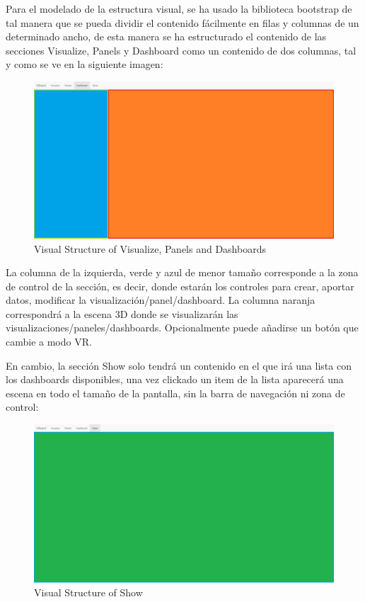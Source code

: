 \documentclass[a4paper, 12pt]{book}
\begin{document}
Para el modelado de la estructura visual, se ha usado la biblioteca bootstrap de tal manera que se pueda dividir el contenido fácilmente en filas y columnas de un determinado ancho, de esta manera se ha estructurado el contenido de las secciones Visualize, Panels y Dashboard como un contenido de dos columnas, tal y como se ve en la siguiente imagen:

\begin{figure}[H]
  \centering
  \includegraphics[width=16cm, keepaspectratio]{img/development/visualstructure}
  \caption{Visual Structure of Visualize, Panels and Dashboards}
  \label{fig:pluginhtml}
\end{figure}

La columna de la izquierda, verde y azul de menor tamaño corresponde a la zona de control de la sección, es decir, donde estarán los controles para crear, aportar datos, modificar la visualización/panel/dashboard. La columna naranja correspondrá a la escena 3D donde se visualizarán las visualizaciones/paneles/dashboards. Opcionalmente puede añadirse un botón que cambie a modo VR.

En cambio, la sección Show solo tendrá un contenido en el que irá una lista con los dashboards disponibles, una vez clickado un item de la lista aparecerá una escena en todo el tamaño de la pantalla, sin la barra de navegación ni zona de control:

\begin{figure}[H]
  \centering
  \includegraphics[width=16cm, keepaspectratio]{img/development/showstructure}
  \caption{Visual Structure of Show}
  \label{fig:pluginhtml}
\end{figure}
\end{document}
